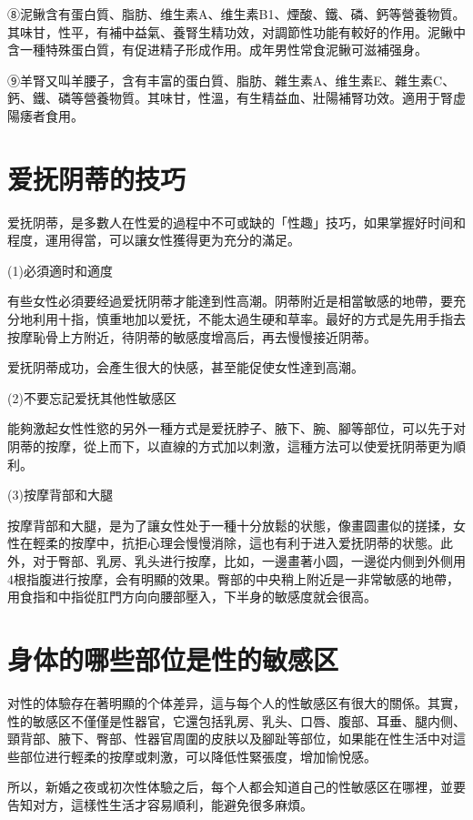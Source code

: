 \documentclass[12pt,UTF8]{ctexbook}
\begin{document}
⑧泥鳅含有蛋白質、脂肪、维生素A、维生素B1、煙酸、鐵、磷、鈣等營養物質。其味甘，性平，有補中益氣、養腎生精功效，对調節性功能有較好的作用。泥鳅中含一種特殊蛋白質，有促进精子形成作用。成年男性常食泥鳅可滋補强身。

⑨羊腎又叫羊腰子，含有丰富的蛋白質、脂肪、雜生素A、维生素E、雜生素C、鈣、鐵、磷等營養物質。其味甘，性溫，有生精益血、壯陽補腎功效。適用于腎虚陽痿者食用。

\section{爱抚阴蒂的技巧}

爱抚阴蒂，是多數人在性爱的過程中不可或缺的「性趣」技巧，如果掌握好时间和程度，運用得當，可以讓女性獲得更为充分的滿足。

(1)必須適时和適度

有些女性必須要经過爱抚阴蒂才能達到性高潮。阴蒂附近是相當敏感的地帶，要充分地利用十指，慎重地加以爱抚，不能太過生硬和草率。最好的方式是先用手指去按摩恥骨上方附近，待阴蒂的敏感度增高后，再去慢慢接近阴蒂。

爱抚阴蒂成功，会產生很大的快感，甚至能促使女性達到高潮。

(2)不要忘記爱抚其他性敏感区

能夠激起女性性慾的另外一種方式是爱抚脖子、腋下、腕、腳等部位，可以先于对阴蒂的按摩，從上而下，以直線的方式加以刺激，這種方法可以使爱抚阴蒂更为順利。

(3)按摩背部和大腿

按摩背部和大腿，是为了讓女性处于一種十分放鬆的状態，像畫圆畫似的搓揉，女性在輕柔的按摩中，抗拒心理会慢慢消除，這也有利于进入爱抚阴蒂的状態。此外，对于臀部、乳房、乳头进行按摩，比如，一邊畫著小圆，一邊從内侧到外侧用4根指腹进行按摩，会有明顯的效果。臀部的中央稍上附近是一非常敏感的地帶，用食指和中指從肛門方向向腰部壓入，下半身的敏感度就会很高。

\section{身体的哪些部位是性的敏感区}

对性的体驗存在著明顯的个体差异，這与每个人的性敏感区有很大的關係。其實，性的敏感区不僅僅是性器官，它還包括乳房、乳头、口唇、腹部、耳垂、腿内侧、頸背部、腋下、臀部、性器官周圍的皮肤以及腳趾等部位，如果能在性生活中对這些部位进行輕柔的按摩或刺激，可以降低性緊張度，增加愉悅感。

所以，新婚之夜或初次性体驗之后，每个人都会知道自己的性敏感区在哪裡，並要告知对方，這樣性生活才容易順利，能避免很多麻煩。
\end{document}
